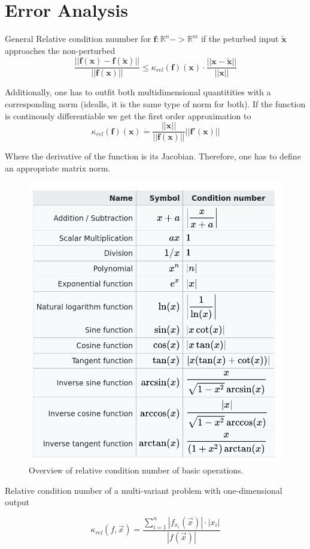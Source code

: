 \documentclass[
    a4paper,
    11pt
]{article}
\begin{document}
\section{Error Analysis}

General Relative condition nuumber for $\mathbf{f}:\mathbb{R}^n -> \mathbb{R}^m$ if the
peturbed input $\mathbf{\tilde{x}}$ approaches the non-perturbed
\begin{equation}
    \frac{||\mathbf{f}(\mathbf{x}) -
    \mathbf{f}(\mathbf{\tilde{x}})||}{||\mathbf{f}(\mathbf{x})||} \le
    \kappa_{rel}(\mathbf{f})(\mathbf{x}) \cdot
    \frac{||\mathbf{x} - \mathbf{\tilde{x}}||}{||\mathbf{x}||}
\end{equation}

Additionally, one has to outfit both multidimensional quantitities with a
corresponding norm (idealls, it is the same type of norm for both). If the
function is continously differentiable we get the first order approximation to
\begin{equation}
    \kappa_{rel}(\mathbf{f})(\mathbf{x}) \dot{=}
    \frac{||\mathbf{x}||}{||\mathbf{f}(\mathbf{x})||}
    ||\mathbf{f}'(\mathbf{x})||
\end{equation}

Where the derivative of the function is its Jacobian. Therefore, one has to
define an appropriate matrix norm.

\begin{figure}[H]
    \centering
    \includegraphics[width=0.5\linewidth]{basicOperations.png}
    \caption{Overview of relative condition number of basic operations.}
\end{figure}

Relative condition number of a multi-variant problem with one-dimensional output

\begin{equation}
    \kappa_{rel}(f, \vec{x}) =
    \frac{
        \sum_{i=1}^{n} \left| f_{x_i}(\vec{x}) \right| \cdot |x_i|
    } {
        \left| f(\vec{x}) \right|
    }
\end{equation}
\end{document}
